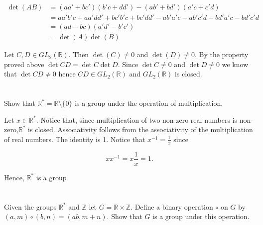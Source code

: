 \documentclass[a4paper]{article}
\begin{document}
\begin{align*}
\det(AB) &= (aa' + bc')(b'c + dd') - (ab' + bd')(a'c + c'd) \\
&= aa'b'c + aa'dd' + bc'b'c + bc'dd' - ab'a'c - ab'c'd - bd'a'c - bd'c'd \\
&= (ad - bc) (a'd' - b'c') \\
&= \det(A) \det(B)
\end{align*}

\vspace{\baselineskip}

Let $C,D \in GL_2(\mathbb{R})$. Then $\det(C) \neq 0$ and $\det(D) \neq 0$. By the property proved above $\det{CD} = \det{C}\det{D}$. Since $\det{C} \neq 0$ and $\det{D} \neq 0$ we know that $\det{CD} \neq{0}$ hence $CD \in GL_2(\mathbb{R})$ and $GL_2(\mathbb{R})$ is closed.


\section{}



\section{}

Show that $\mathbb{R}^{*} = \mathbb{R} \setminus \{ 0 \}$ is a group under the operation of multiplication.

\vspace{\baselineskip}

Let $x \in \mathbb{R}^{*}$. Notice that, since multiplication of two non-zero real numbers is non-zero,$\mathbb{R}^{*}$ is closed. Associativity follows from the associativity of the multiplication of real numbers. The identity is 1. Notice that $x^{-1} = \frac{1}{x}$ since

$$xx^{-1} = x \frac{1}{x} = 1.$$

Hence, $\mathbb{R}^*$ is a group


\section{}

Given the groups $\mathbb{R}^*$ and $\mathbb{Z}$ let $G = \mathbb{R} \times \mathbb{Z}$. Define a binary operation $\circ$ on $G$ by $(a,m) \circ (b,n) = (ab, m+n)$. Show that $G$ is a group under this operation.

\vspace{\baselineskip}
\end{document}
